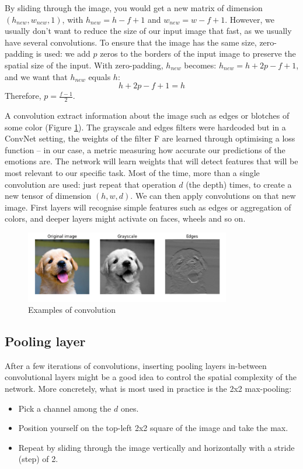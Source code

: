 By sliding through the image, you would get a new matrix of dimension $(h_{new}, w_{new},1)$, with $h_{new}=h-f+1$ and $w_{new}=w-f+1$. However, we usually don't want to reduce the size of our input image that fast, as we usually have several convolutions. To ensure that the image has the same size, zero-padding is used: we add $p$ zeros to the borders of the input image to preserve the spatial size of the input. With zero-padding, $h_{new}$ becomes: $h_{new} =  h + 2p - f + 1$, and we want that $h_{new}$ equals $h$:
$$ h + 2p - f + 1 = h$$
Therefore, $p=\frac{f-1}{2}$.

A convolution extract information about the image such as edges or blotches of some color (Figure \ref{conv-ex}). The grayscale and edges filters were hardcoded but in a ConvNet setting, the weights of the filter F are learned through optimising a loss function -- in our case, a metric measuring how accurate our predictions of the emotions are. The network will learn weights that will detect features that will be most relevant to our specific task. Most of the time, more than a single convolution are used: just repeat that operation $d$ (the depth) times, to create a new tensor of dimension $(h,w,d)$. We can then apply convolutions on that new image. First layers will recognise simple features such as edges or aggregation of colors, and deeper layers might activate on faces, wheels and so on.

\begin{figure}
\centering
\includegraphics[width=0.8\textwidth]{Images/conv_ex.png}
\caption{Examples of convolution}
\label{conv-ex}
\end{figure}

\subsection{Pooling layer}
After a few iterations of convolutions, inserting pooling layers in-between convolutional layers might be a good idea to control the spatial complexity of the network. More concretely, what is most used in practice is the 2x2 max-pooling:
\begin{itemize}
\item Pick a channel among the $d$ ones.
\item Position yourself on the top-left 2x2 square of the image and take the max.
\item Repeat by sliding through the image vertically and horizontally with a stride (step) of 2.
\end{itemize}

